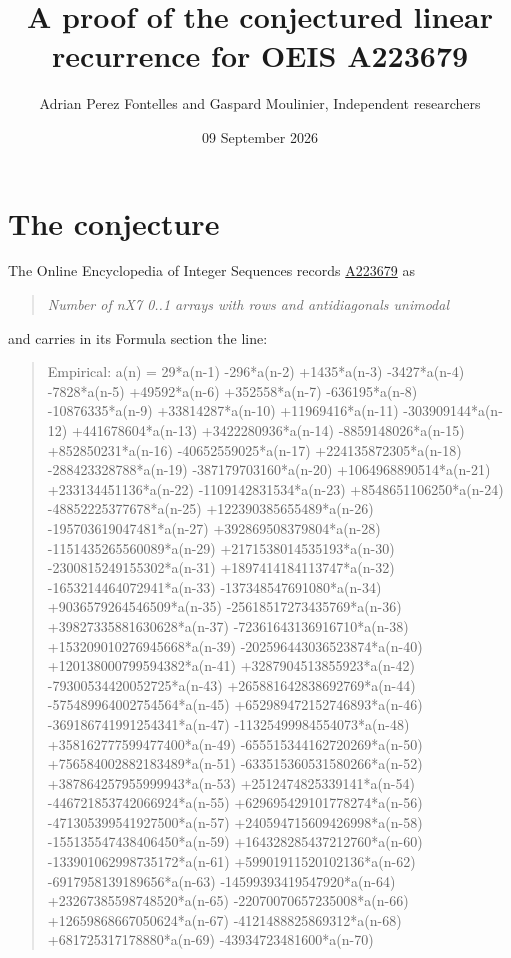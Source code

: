 \documentclass[11pt]{article}
\title{A proof of the conjectured linear recurrence for OEIS A223679}
\author{Adrian Perez Fontelles and Gaspard Moulinier, Independent researchers}
\date{09 September 2026}
\theoremstyle{definition}
\begin{document}
\maketitle
\section{The conjecture}

The Online Encyclopedia of Integer Sequences records \href{https://oeis.org/A223679}{A223679} as

\begin{quote}\itshape Number of nX7 0..1 arrays with rows and antidiagonals unimodal\end{quote}

and carries in its Formula section the line:

\begin{quote}\ttfamily Empirical: a(n) = 29*a(n-1) -296*a(n-2) +1435*a(n-3) -3427*a(n-4) -7828*a(n-5) +49592*a(n-6) +352558*a(n-7) -636195*a(n-8) -10876335*a(n-9) +33814287*a(n-10) +11969416*a(n-11) -303909144*a(n-12) +441678604*a(n-13) +3422280936*a(n-14) -8859148026*a(n-15) +852850231*a(n-16) -40652559025*a(n-17) +224135872305*a(n-18) -288423328788*a(n-19) -387179703160*a(n-20) +1064968890514*a(n-21) +233134451136*a(n-22) -1109142831534*a(n-23) +8548651106250*a(n-24) -48852225377678*a(n-25) +122390385655489*a(n-26) -195703619047481*a(n-27) +392869508379804*a(n-28) -1151435265560089*a(n-29) +2171538014535193*a(n-30) -2300815249155302*a(n-31) +1897414184113747*a(n-32) -1653214464072941*a(n-33) -137348547691080*a(n-34) +9036579264546509*a(n-35) -25618517273435769*a(n-36) +39827335881630628*a(n-37) -72361643136916710*a(n-38) +153209010276945668*a(n-39) -202596443036523874*a(n-40) +120138000799594382*a(n-41) +3287904513855923*a(n-42) -79300534420052725*a(n-43) +265881642838692769*a(n-44) -575489964002754564*a(n-45) +652989472152746893*a(n-46) -369186741991254341*a(n-47) -11325499984554073*a(n-48) +358162777599477400*a(n-49) -655515344162720269*a(n-50) +756584002882183489*a(n-51) -633515360531580266*a(n-52) +387864257955999943*a(n-53) +2512474825339141*a(n-54) -446721853742066924*a(n-55) +629695429101778274*a(n-56) -471305399541927500*a(n-57) +240594715609426998*a(n-58) -155135547438406450*a(n-59) +164328285437212760*a(n-60) -133901062998735172*a(n-61) +59901911520102136*a(n-62) -6917958139189656*a(n-63) -14599393419547920*a(n-64) +23267385598748520*a(n-65) -22070070657235008*a(n-66) +12659868667050624*a(n-67) -4121488825869312*a(n-68) +681725317178880*a(n-69) -43934723481600*a(n-70)\end{quote}
\end{document}
